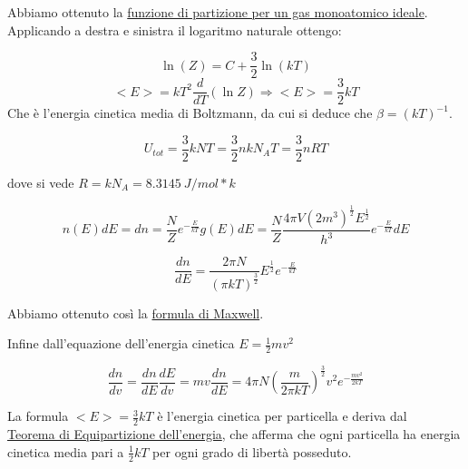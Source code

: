 Abbiamo ottenuto la \underline{funzione di partizione per un gas monoatomico ideale}.
Applicando a destra e sinistra il logaritmo naturale ottengo:

$$ \ln (Z) = C + \frac{3}{2} \ln ( k T ) $$
$$ <E> = k T^2 \frac{d}{dT} (\ln Z)  \Rightarrow <E> = \frac{3}{2} k T$$
Che è l'energia cinetica media di Boltzmann, da cui si deduce che $\beta = (k T)^{-1}$.

$$  U_{tot} =  \frac{3}{2} k N T = \frac{3}{2} n k N_A T = \frac{3}{2} n R T $$

dove si vede $R = k N_A = \SI{8.3145}{J / mol * k}$

\begin{equation} 
n(E) dE = d n = \frac{N}{Z} e^{- \frac{E}{k T} } g(E) dE = \frac{N}{Z} \frac{4 \pi V (2m^3)^\frac{1}{2} E^\frac{1}{2} }{ h^3 } e^{- \frac{E}{k T}}  dE 
\end{equation}


\begin{equation} \label{formula_maxwell}
\frac{dn}{dE} = \frac{2 \pi N}{(\pi k T)^\frac{3}{2}} E^\frac{1}{2} e^{-\frac{E}{k T}}
\end{equation}

Abbiamo ottenuto così la \underline{formula di Maxwell}.

Infine dall'equazione dell'energia cinetica $E = \frac{1}{2} m v^2$

\begin{equation}
\frac{dn}{dv} = \frac{dn}{dE} \frac{dE}{dv} = mv \frac{dn}{dE} = 4 \pi N (\frac{m}{2 \pi k T})^\frac{3}{2} v^2 e^{- \frac{m v^2}{2 k T}}
\end{equation}

La formula $<E> = \frac{3}{2} k T $ è l'energia cinetica per particella e deriva dal \\
\underline{Teorema di Equipartizione dell'energia}, 
che afferma che ogni particella ha energia cinetica media pari a $\frac{1}{2} k T$ per ogni grado di libertà posseduto.


















